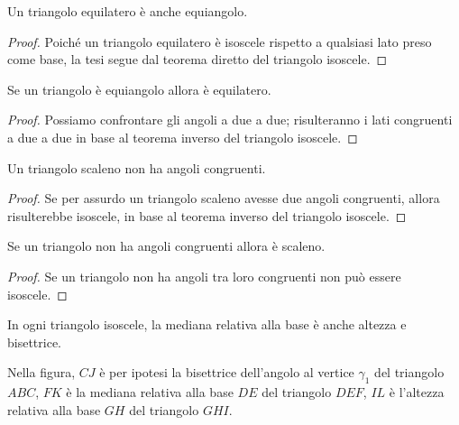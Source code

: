 \begin{corollario}
Un triangolo equilatero è anche equiangolo.
\end{corollario}

\begin{proof}
Poiché un triangolo equilatero è isoscele rispetto a qualsiasi lato 
preso come base, la tesi segue dal teorema diretto del triangolo 
isoscele.
\end{proof}

\begin{corollario}
Se un triangolo è equiangolo allora è equilatero.
\end{corollario}

\begin{proof}
Possiamo confrontare gli angoli a due a due; risulteranno i lati 
congruenti a due a due in base al teorema inverso del triangolo 
isoscele.
\end{proof}

\begin{corollario}
Un triangolo scaleno non ha angoli congruenti.
\end{corollario}

\begin{proof}
Se per assurdo un triangolo scaleno avesse due angoli congruenti, 
allora risulterebbe isoscele, in base al teorema inverso del 
triangolo isoscele.
\end{proof}

\begin{corollario}
Se un triangolo non ha angoli congruenti allora è scaleno.
\end{corollario}

\begin{proof}
Se un triangolo non ha angoli tra loro congruenti non può essere 
isoscele.
\end{proof}

\begin{proposizione}
In ogni triangolo isoscele, la mediana relativa alla base è anche 
altezza e bisettrice.
\end{proposizione}
Nella figura, \(CJ\) è per ipotesi la bisettrice dell'angolo al vertice 
\(\gamma_1\) del triangolo \(ABC\), \(FK\) è la mediana relativa alla base 
\(DE\) del triangolo \(DEF\), \(IL\) è l'altezza relativa alla base \(GH\) 
del triangolo \(GHI\).


\begin{inaccessibleblock}
 \begin{figure}[htb]
\centering
\end{figure}
\end{inaccessibleblock}

